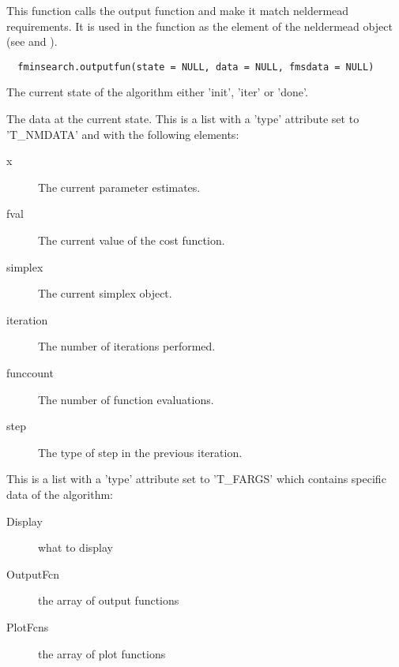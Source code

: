 %
\begin{Description}\relax
This function calls the output function and make it match neldermead
requirements. It is used in the  function as the
 element of the neldermead object (see
 and ).
\end{Description}
%
\begin{Usage}
\begin{verbatim}
  fminsearch.outputfun(state = NULL, data = NULL, fmsdata = NULL)
\end{verbatim}
\end{Usage}
%
\begin{Arguments}
\begin{ldescription}
\item[\code{state}] The current state of the algorithm either 'init', 'iter' or
'done'.
\item[\code{data}] The data at the current state. This is a list with a 'type'
attribute set to 'T\_NMDATA' and  with the following elements:\begin{description}

\item[x] The current parameter estimates.
\item[fval] The current value of the cost function.
\item[simplex] The current simplex object.
\item[iteration] The number of iterations performed.
\item[funccount] The number of function evaluations.
\item[step] The type of step in the previous iteration.

\end{description}


\item[\code{fmsdata}] This is a list with a 'type' attribute set to 'T\_FARGS'
which contains specific data of the  algorithm: \begin{description}

\item[Display] what to display
\item[OutputFcn] the array of output functions
\item[PlotFcns] the array of plot functions

\end{description}


\end{ldescription}
\end{Arguments}
